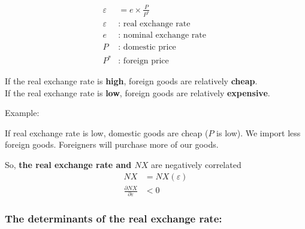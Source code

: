\documentclass[12pt]{article}
\begin{document}
\begin{align*}
\varepsilon &= e  \times \frac{P}{P^{*}}\\
\varepsilon &\text{: real exchange rate }\\
e &: \text{ nominal exchange rate }\\
P &: \text{ domestic price }\\
P^{*} &: \text{ foreign price }
\end{align*}

If the real exchange rate is {\textbf {high}}, foreign goods are relatively 
{\textbf {cheap}}.\\
If the real exchange rate is {\textbf {low}}, foreign goods are relatively 
{\textbf {expensive}}.

Example:

If real exchange rate is low, domestic goods are cheap ($ P $ is low). We import 
less foreign goods. Foreigners will purchase more of our goods.

So, {\textbf {the real exchange rate and $ NX $} are negatively correlated}
\begin{align*}
NX &= NX(\varepsilon)\\
\frac{\partial NX }{\partial \varepsilon } &< 0
\end{align*}

\begin{figure}[H]
\end{figure}




\subsubsection{The determinants of the real exchange rate:}
\end{document}

